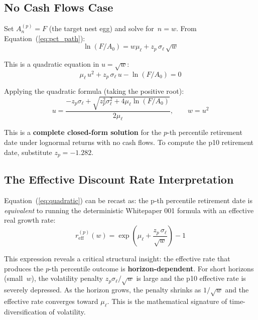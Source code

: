 \documentclass[11pt,letterpaper]{article}
\begin{document}
\subsection{No Cash Flows Case}

Set $A_n^{(p)} = F$ (the target nest egg) and solve for~$n = w$. From Equation~(\ref{eq:pct_path}):
\begin{equation}
\ln(F/A_0) = w\mu_\ell + z_p\,\sigma_\ell\,\sqrt{w}
\end{equation}

This is a quadratic equation in $u = \sqrt{w}$:
\begin{equation}
\mu_\ell\, u^2 + z_p\,\sigma_\ell\, u - \ln(F/A_0) = 0
\end{equation}

Applying the quadratic formula (taking the positive root):
\begin{equation}
\boxed{u = \frac{-z_p\sigma_\ell + \sqrt{z_p^2\sigma_\ell^2 + 4\mu_\ell\ln(F/A_0)}}{2\mu_\ell}, \qquad w = u^2}
\label{eq:quadratic}
\end{equation}

\noindent This is a \textbf{complete closed-form solution} for the $p$-th percentile retirement date under lognormal returns with no cash flows. To compute the p10 retirement date, substitute $z_p = -1.282$.

\subsection{The Effective Discount Rate Interpretation}

Equation~(\ref{eq:quadratic}) can be recast as: the p-th percentile retirement date is \emph{equivalent} to running the deterministic Whitepaper 001 formula with an effective real growth rate:
\begin{equation}
\boxed{r_{\text{eff}}^{(p)}(w) = \exp\!\left(\mu_\ell + \frac{z_p\,\sigma_\ell}{\sqrt{w}}\right) - 1}
\label{eq:reff}
\end{equation}

This expression reveals a critical structural insight: the effective rate that produces the $p$-th percentile outcome is \textbf{horizon-dependent}. For short horizons (small~$w$), the volatility penalty $z_p\sigma_\ell/\sqrt{w}$ is large and the p10 effective rate is severely depressed. As the horizon grows, the penalty shrinks as $1/\sqrt{w}$ and the effective rate converges toward $\mu_\ell$. This is the mathematical signature of time-diversification of volatility.
\end{document}
